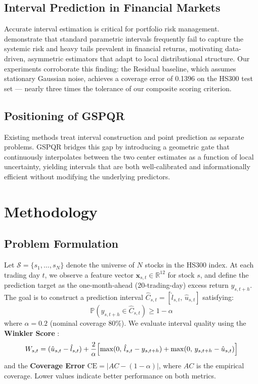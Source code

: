 \documentclass[12pt, a4paper]{article}
\begin{document}
\subsection{Interval Prediction in Financial Markets}

Accurate interval estimation is critical for portfolio risk management.
\citet{keilbar2022} demonstrate that standard parametric intervals frequently fail to
capture the systemic risk and heavy tails prevalent in financial returns, motivating
data-driven, asymmetric estimators that adapt to local distributional structure. Our
experiments corroborate this finding: the Residual baseline, which assumes stationary
Gaussian noise, achieves a coverage error of 0.1396 on the HS300 test set --- nearly
three times the tolerance of our composite scoring criterion.

\subsection{Positioning of GSPQR}

Existing methods treat interval construction and point prediction as separate problems.
GSPQR bridges this gap by introducing a geometric gate that continuously interpolates
between the two center estimates as a function of local uncertainty, yielding intervals
that are both well-calibrated and informationally efficient without modifying the
underlying predictors.

\section{Methodology}

\subsection{Problem Formulation}

Let $\mathcal{S} = \{s_1, \ldots, s_N\}$ denote the universe of $N$ stocks in the
HS300 index. At each trading day $t$, we observe a feature vector
$\mathbf{x}_{s,t} \in \mathbb{R}^{12}$ for stock $s$, and define the prediction target
as the one-month-ahead (20-trading-day) excess return $y_{s,t+h}$. The goal is to
construct a prediction interval $\hat{C}_{s,t} = [\hat{l}_{s,t},\, \hat{u}_{s,t}]$
satisfying:
%
\begin{equation}
\mathbb{P}\!\left(y_{s,t+h} \in \hat{C}_{s,t}\right) \geq 1 - \alpha
\end{equation}
%
where $\alpha = 0.2$ (nominal coverage 80\%). We evaluate interval quality using the
\textbf{Winkler Score} \citep{winkler1972}:
%
\begin{equation}
W_{s,t} = (\hat{u}_{s,t} - \hat{l}_{s,t})
+ \frac{2}{\alpha}\Bigl[
    \max(0,\, \hat{l}_{s,t} - y_{s,t+h})
  + \max(0,\, y_{s,t+h} - \hat{u}_{s,t})
\Bigr]
\end{equation}
%
and the \textbf{Coverage Error} $\text{CE} = |AC - (1-\alpha)|$, where $AC$ is the
empirical coverage. Lower values indicate better performance on both metrics.
\end{document}
